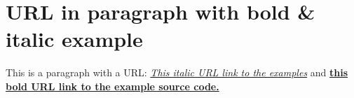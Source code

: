 \documentclass[a4paper]{report}
\begin{document}
\chapter{URL in paragraph with bold \& italic example}

This is a paragraph with a URL: \textit{\href{https://github.com/tom-bjorkholm/mformat/blob/master/example}{This italic URL link to the examples}} and \textbf{\href{https://github.com/tom-bjorkholm/mformat/blob/master/example/src}{this bold URL link to the example source code.}}
\end{document}
